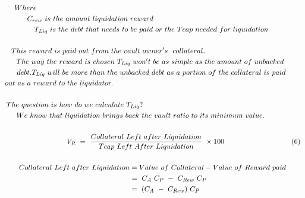 {\begin{gather}
 \notag\\
Where\ \ \ \ \ \ \ \ \ \ \ \ \ \ \ \ \ \ \ \ \ \ \ \ \ \ \ \ \ \ \ \ \ \ \ \ \ \ \ \ \ \ \ \ \ \ \ \ \ \ \ \ \ \ \ \ \ \ \ \ \ \ \ \ \ \ \ \ \ \ \ \ \ \ \ \ \ \ \ \ \ \ \ \ \ \ \ \ \ \ \ \ \ \ \ \ \ \ \ \ \ \ \ \ \  \notag\\
C_{rew} \ is\ the\ amount\ liquidation\ reward\ \ \ \ \ \ \ \ \ \ \ \ \ \ \ \ \ \ \ \ \ \ \ \ \ \ \ \ \ \ \ \ \ \ \ \ \ \ \ \ \ \ \ \ \ \ \ \ \ \ \  \notag\\
T_{Liq} \ is\ the\ debt\ that\ needs\ to\ be\ paid\ or\ the\ Tcap\ needed\ for\ liquidation \notag\\
 \notag\\
\ \ This\ reward\ is\ paid\ out\ from\ the\ vault\ owner's\ \ collateral.\ \ \ \ \ \ \ \ \ \ \ \ \ \ \ \ \ \ \ \ \ \ \ \ \ \ \ \ \ \ \ \ \ \ \ \ \ \  \notag\\
The\ way\ the\ reward\ is\ chosen\ T_{Liq} \ won't\ be\ as\ simple\ as\ the\ amount\ of\ unbacked\  \notag\\
debt.T_{Liq} \ will\ be\ more\ than\ the\ unbacked\ debt\ as\ a\ portion\ of\ the\ collateral\ is\ paid \notag\\
out\ as\ a\ reward\ to\ the\ liquidator.\ \ \ \ \ \ \ \ \ \ \ \ \ \ \ \ \ \ \ \ \ \ \ \ \ \ \ \ \ \ \ \ \ \ \ \ \ \ \ \ \ \ \ \ \ \ \ \ \ \ \ \ \ \ \ \ \ \ \ \ \ \ \ \ \ \ \ \ \ \ \ \ \ \ \ \ \  \notag\\
 \notag\\
\ The\ question\ is\ how\ do\ we\ calculate\ T_{Liq} ?\ \ \ \ \ \ \ \ \ \ \ \ \ \ \ \ \ \ \ \ \ \ \ \ \ \ \ \ \ \ \ \ \ \ \ \ \ \ \ \ \ \ \ \ \ \ \ \ \ \ \ \ \ \ \ \ \ \ \ \ \ \ \ \ \  \notag\\
We\ know\ that\ liquidation\ brings\ back\ the\ vault\ ratio\ to\ its\ minimum\ value.\ \ \ \ \ \ \ \ \  \notag\\
\ \ \ \ \ \  \notag\\
\ \ \ \ \ \ \ \ \ \ \ \ \ \ \ \ \ \ \ \ \ \ \ \ \ \ \ V_{R} \ =\ \frac{Collateral\ Left\ after\ Liquidation}{Tcap\ Left\ After\ Liquidation} \ \times 100\ \ \ \ \ \ \ \ \ \ \ \ \ \ \ \ \ \ \ \ \ \ \ \ \ \ \ \ ( 6)\\
 \notag\\
\ Collateral\ Left\ after\ Liquidation=Value\ of\ Collateral-Value\ of\ Reward\ paid \notag\\
\ \ \ \ \ \ \ \ \ \ \ \ \ \ \ =\ C_{A} \ C_{P} \ -\ C_{Rew} \ C_{P} \notag\\
\ \ \ \ \ \ \ \ \ \ \ \ =\ ( C_{A} \ -\ C_{Rew}) \ C_{P} \notag\\

\end{gather}}
